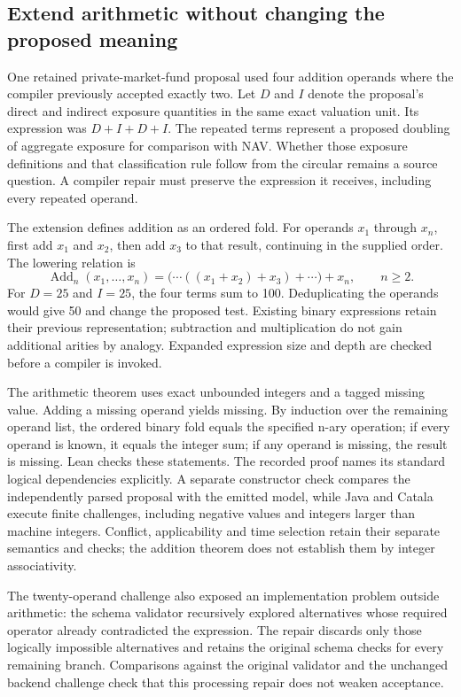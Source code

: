 \subsection{Extend arithmetic without changing the proposed meaning}

One retained private-market-fund proposal used four addition operands where
the compiler previously accepted exactly two. Let $D$ and $I$ denote the
proposal's direct and indirect exposure quantities in the same exact valuation
unit. Its expression was $D+I+D+I$. The repeated terms represent a proposed
doubling of aggregate exposure for comparison with NAV. Whether those exposure
definitions and that classification rule follow from the circular remains a
source question. A compiler repair must preserve the expression it receives,
including every repeated operand.

The extension defines addition as an ordered fold. For operands $x_1$ through
$x_n$, first add $x_1$ and $x_2$, then add $x_3$ to that result, continuing in
the supplied order. The lowering relation is
\begin{equation}
  \operatorname{Add}_n(x_1,\ldots,x_n)
  = \bigl(\cdots((x_1+x_2)+x_3)+\cdots\bigr)+x_n,
  \qquad n\geq 2.
  \label{eq:continuation-ordered-addition}
\end{equation}
For $D=25$ and $I=25$, the four terms sum to 100. Deduplicating the operands
would give 50 and change the proposed test. Existing binary expressions retain
their previous representation; subtraction and multiplication do not gain
additional arities by analogy. Expanded expression size and depth are checked
before a compiler is invoked.

The arithmetic theorem uses exact unbounded integers and a tagged missing
value. Adding a missing operand yields missing. By induction over the remaining
operand list, the ordered binary fold equals the specified n-ary operation;
if every operand is known, it equals the integer sum; if any operand is missing,
the result is missing. Lean checks these statements. The recorded proof names
its standard logical dependencies explicitly. A separate constructor check
compares the independently parsed proposal with the emitted model, while Java
and Catala execute finite challenges, including negative values and integers
larger than machine integers. Conflict, applicability and time selection retain
their separate semantics and checks; the addition theorem does not establish
them by integer associativity.

The twenty-operand challenge also exposed an implementation problem outside
arithmetic: the schema validator recursively explored alternatives whose
required operator already contradicted the expression. The repair discards
only those logically impossible alternatives and retains the original schema
checks for every remaining branch. Comparisons against the original validator
and the unchanged backend challenge check that this processing repair does not
weaken acceptance.

